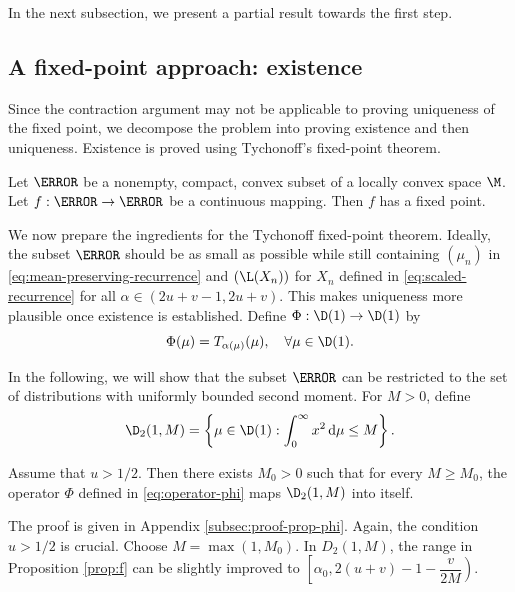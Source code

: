 In the next subsection, we present a partial result towards the first step.

\subsection{A fixed-point approach: existence}

Since the contraction argument may not be applicable to proving uniqueness of the fixed point, we decompose the problem into proving existence and then uniqueness. Existence is proved using Tychonoff's fixed-point theorem.

\begin{theorem}
  Let $\C$ be a nonempty, compact, convex subset of a locally convex space $\M$. Let $f: \C \to \C$ be a continuous mapping. Then $f$ has a fixed point.
\end{theorem}

We now prepare the ingredients for the Tychonoff fixed-point theorem. Ideally, the subset $\C$ should be as small as possible while still containing $(\mu_n)$ in \eqref{eq:mean-preserving-recurrence} and $(\L(X_n))$ for $X_n$ defined in \eqref{eq:scaled-recurrence} for all $\alpha\in(2u+v-1, 2u+v)$. This makes uniqueness more plausible once existence is established. Define $\Phi: \D(1) \to \D(1)$ by
\begin{equation}
  \label{eq:operator-phi}
  \Phi(\mu) = T_{\alpha(\mu)}(\mu), \quad \forall \mu\in \D(1).
\end{equation}

In the following, we will show that the subset $\C$ can be restricted to the set of distributions with uniformly bounded second moment. For $M > 0$, define
\begin{equation}
  \label{eq:bounded-second-moment}
  \D_2(1, M) = \left\{\mu\in \D(1): \int_{0}^\infty x^2 \,\mathrm{d}\mu \le M\right\}.
\end{equation}

\begin{proposition}
  \label{prop:uniform-bounded-second-moment}
  Assume that $u>1/2$. Then there exists $M_0 > 0$ such that for every $M \ge M_0 $, the operator $\Phi$ defined in \eqref{eq:operator-phi} maps $\D_2(1, M)$ into itself.
\end{proposition}


The proof is given in Appendix \ref{subsec:proof-prop-phi}. Again, the condition $u>1/2$ is crucial. Choose $M = \max(1, M_0)$. In $D_2(1,M)$, the range in Proposition \ref{prop:f} can be slightly improved to $\left[\alpha_0, 2(u+v)-1-\dfrac{v}{2M}\right)$.

